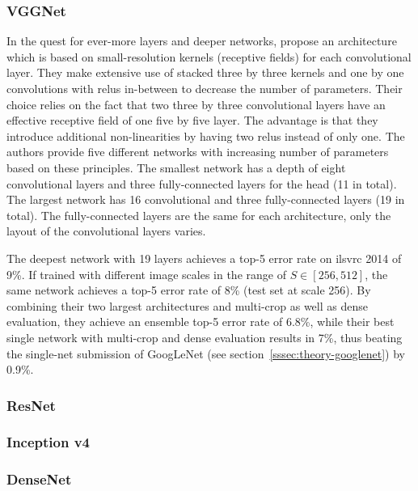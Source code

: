 \documentclass[draft,final]{vutinfth} %
\begin{document}
\subsubsection{VGGNet}
\label{sssec:theory-vggnet}

In the quest for ever-more layers and deeper networks,
\textcite{simonyan2015} propose an architecture which is based on
small-resolution kernels (receptive fields) for each convolutional
layer. They make extensive use of stacked three by three kernels and
one by one convolutions with \glspl{relu} in-between to decrease the
number of parameters. Their choice relies on the fact that two three
by three convolutional layers have an effective receptive field of one
five by five layer. The advantage is that they introduce additional
non-linearities by having two \glspl{relu} instead of only one. The
authors provide five different networks with increasing number of
parameters based on these principles. The smallest network has a depth
of eight convolutional layers and three fully-connected layers for the
head (11 in total). The largest network has 16 convolutional and three
fully-connected layers (19 in total). The fully-connected layers are
the same for each architecture, only the layout of the convolutional
layers varies.

The deepest network with 19 layers achieves a top-5 error rate on
\gls{ilsvrc} 2014 of 9\%. If trained with different image scales in
the range of $S \in [256, 512]$, the same network achieves a top-5 error
rate of 8\% (test set at scale 256). By combining their two largest
architectures and multi-crop as well as dense evaluation, they achieve
an ensemble top-5 error rate of 6.8\%, while their best single network
with multi-crop and dense evaluation results in 7\%, thus beating the
single-net submission of GoogLeNet (see
section~\ref{sssec:theory-googlenet}) by 0.9\%.

\subsubsection{ResNet}
\label{sssec:theory-resnet}

\subsubsection{Inception v4}
\label{sssec:theory-inception-v4}

\subsubsection{DenseNet}
\label{sssec:theory-densenet}
\end{document}
